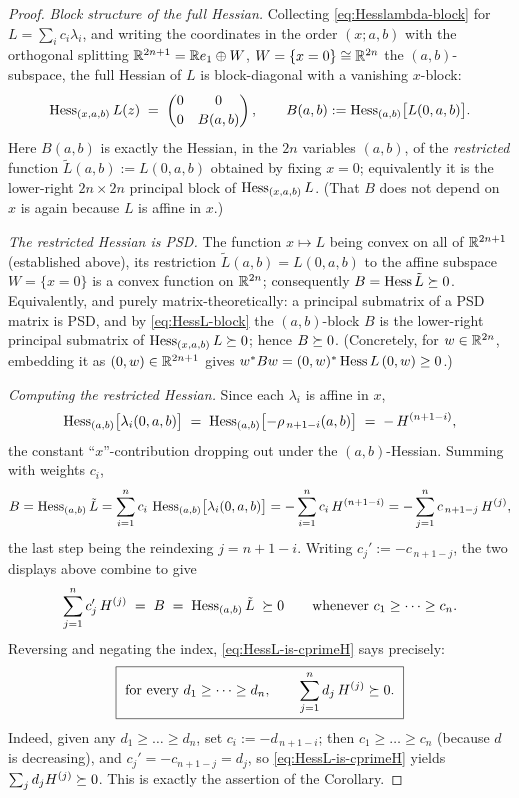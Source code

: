 \begin{proof}
\smallskip\noindent\emph{Block structure of the full Hessian.} Collecting
\eqref{eq:Hesslambda-block} for $L=\sum_i c_i\lambda_i$, and writing the
coordinates in the order $(x;a,b)$ with the orthogonal splitting
$\mathbb{R}^{2n+1}=\mathbb{R} e_1\oplus W$, $W=\{x=0\}\cong\mathbb{R}^{2n}$ the
$(a,b)$-subspace, the full Hessian of $L$ is block-diagonal with a vanishing
$x$-block:
\begin{equation}\label{eq:HessL-block}
\operatorname{Hess}_{(x,a,b)}L(z)
\;=\;
\begin{pmatrix} 0 & 0\\[2pt] 0 & B(a,b)\end{pmatrix},
\qquad
B(a,b):=\operatorname{Hess}_{(a,b)}\bigl[L(0,a,b)\bigr].
\end{equation}
Here $B(a,b)$ is exactly the Hessian, in the $2n$ variables $(a,b)$, of the
\emph{restricted} function $\tilde L(a,b):=L(0,a,b)$ obtained by fixing $x=0$;
equivalently it is the lower-right $2n\times2n$ principal block of
$\operatorname{Hess}_{(x,a,b)}L$. (That $B$ does not depend on $x$ is again because $L$ is
affine in $x$.)

\smallskip\noindent\emph{The restricted Hessian is PSD.} The function
$x\mapsto L$ being convex on all of $\mathbb{R}^{2n+1}$ (established above), its
restriction $\tilde L(a,b)=L(0,a,b)$ to the affine subspace $W=\{x=0\}$ is a
convex function on $\mathbb{R}^{2n}$; consequently $B=\operatorname{Hess}\tilde L\succeq 0$.
Equivalently, and purely matrix-theoretically: a principal submatrix of a PSD
matrix is PSD, and by \eqref{eq:HessL-block} the $(a,b)$-block $B$ is the
lower-right principal submatrix of $\operatorname{Hess}_{(x,a,b)}L\succeq 0$; hence
$B\succeq 0$. (Concretely, for $w\in\mathbb{R}^{2n}$, embedding it as
$(0,w)\in\mathbb{R}^{2n+1}$ gives $w^\ast B w=(0,w)^\ast\operatorname{Hess} L\,(0,w)\ge0$.)

\smallskip\noindent\emph{Computing the restricted Hessian.} Since each
$\lambda_i$ is affine in $x$,
\[
\operatorname{Hess}_{(a,b)}\bigl[\lambda_i(0,a,b)\bigr]
\;=\;\operatorname{Hess}_{(a,b)}\bigl[-\rho_{\,n+1-i}(a,b)\bigr]
\;=\;-\,H^{(n+1-i)},
\]
the constant ``$x$''-contribution dropping out under the $(a,b)$-Hessian. Summing
with weights $c_i$,
\[
B
=\operatorname{Hess}_{(a,b)}\tilde L
=\sum_{i=1}^n c_i\,\operatorname{Hess}_{(a,b)}\bigl[\lambda_i(0,a,b)\bigr]
=-\sum_{i=1}^n c_i\,H^{(n+1-i)}
=-\sum_{j=1}^n c_{\,n+1-j}\,H^{(j)},
\]
the last step being the reindexing $j=n+1-i$. Writing $c_j':=-c_{\,n+1-j}$,
the two displays above combine to give
\begin{equation}\label{eq:HessL-is-cprimeH}
\sum_{j=1}^n c_j'\,H^{(j)}\;=\;B\;=\;\operatorname{Hess}_{(a,b)}\tilde L\;\succeq 0
\qquad\text{whenever }c_1\ge\dots\ge c_n .
\end{equation}
Reversing and negating the index, \eqref{eq:HessL-is-cprimeH} says precisely:
\[
\boxed{\ \text{for every }d_1\ge\dots\ge d_n,\qquad \sum_{j=1}^n d_j\,H^{(j)}\qfourPSD.\ }
\]
Indeed, given any $d_1\ge\dots\ge d_n$, set $c_i:=-d_{\,n+1-i}$; then
$c_1\ge\dots\ge c_n$ (because $d$ is decreasing), and $c_j'=-c_{n+1-j}=d_j$, so
\eqref{eq:HessL-is-cprimeH} yields $\sum_j d_j H^{(j)}\succeq 0$. This is exactly the assertion of the Corollary.


\end{proof}
